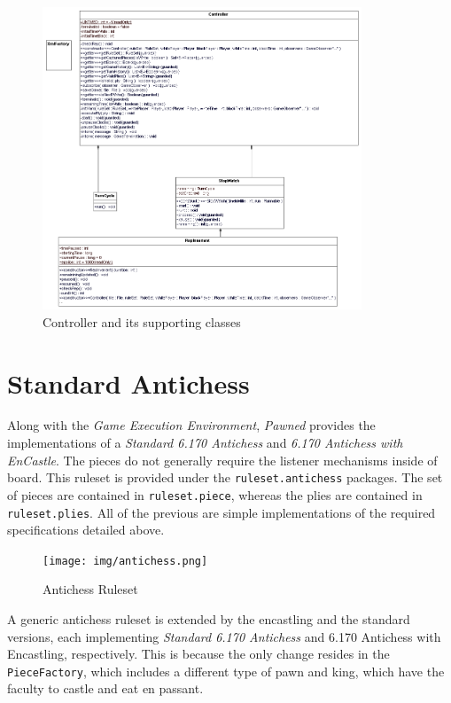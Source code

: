		\begin{figure}
			\begin{center}
				\includegraphics[width=270pt]{img/controller.png}
						\caption{Controller and its supporting classes}
	  			\label{controller}
		   \end{center}
	\end{figure}					

%
\section{Standard Antichess}

Along with the \emph{Game Execution Environment}, \emph{Pawned} provides the implementations of a \emph{Standard 6.170 Antichess} and \emph{6.170 Antichess with EnCastle}. The pieces do not generally require the listener mechanisms inside
of board. This ruleset is provided under the \texttt{ruleset.antichess} packages. The set of pieces are contained in 
\texttt{ruleset.piece}, whereas the plies are contained in \texttt{ruleset.plies}. All of the previous are simple 
implementations of the required specifications detailed above. 


		\begin{figure}
			\begin{center}
				\texttt{[image: img/antichess.png]}
						\caption{Antichess Ruleset}
	  			\label{controller}
		   \end{center}
	\end{figure}					
	

A generic antichess ruleset is extended by the encastling and the standard versions, each implementing \emph{Standard
6.170 Antichess} and {6.170 Antichess with Encastling, respectively}. This is because the only change resides in the
\texttt{PieceFactory}, which includes a different type of pawn and king, which have the faculty to castle and eat
en passant. 

